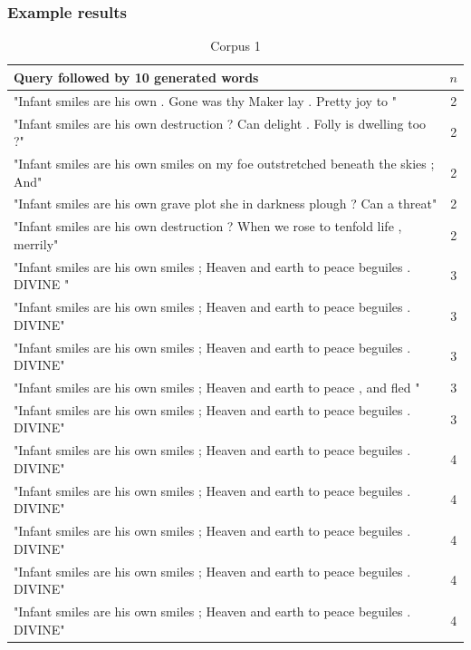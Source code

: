 \documentclass[a4paper,12pt]{article}
\begin{document}
\subsubsection{Example results}

\begin{table}
\begin{tabular}{| l |c|}
\hline
Query followed by 10 generated words & $n$ \\ \hline
"Infant smiles are his own . Gone was thy Maker lay . Pretty joy to " & 2\\ \hline
"Infant smiles are his own destruction ? Can delight . Folly is dwelling too ?"& 2 \\ \hline
"Infant smiles are his own smiles on my foe outstretched beneath the skies ; And" & 2 \\ \hline
"Infant smiles are his own grave plot she in darkness plough ? Can a threat" & 2 \\ \hline
"Infant smiles are his own destruction ? When we rose to tenfold life , merrily" & 2 \\ \hline

"Infant smiles are his own smiles ; Heaven and earth to peace beguiles . DIVINE " & 3 \\ \hline
"Infant smiles are his own smiles ; Heaven and earth to peace beguiles . DIVINE" & 3 \\ \hline
"Infant smiles are his own smiles ; Heaven and earth to peace beguiles . DIVINE" & 3 \\ \hline
"Infant smiles are his own smiles ; Heaven and earth to peace , and fled " & 3 \\ \hline
"Infant smiles are his own smiles ; Heaven and earth to peace beguiles . DIVINE" & 3 \\ \hline

"Infant smiles are his own smiles ; Heaven and earth to peace beguiles . DIVINE" & 4 \\ \hline
"Infant smiles are his own smiles ; Heaven and earth to peace beguiles . DIVINE" & 4 \\ \hline
"Infant smiles are his own smiles ; Heaven and earth to peace beguiles . DIVINE" & 4 \\ \hline
"Infant smiles are his own smiles ; Heaven and earth to peace beguiles . DIVINE" & 4 \\ \hline
"Infant smiles are his own smiles ; Heaven and earth to peace beguiles . DIVINE" & 4 \\ \hline
\end{tabular}
\caption{ Corpus 1}
\label{tab:corpora1}
\end{table}
\end{document}
